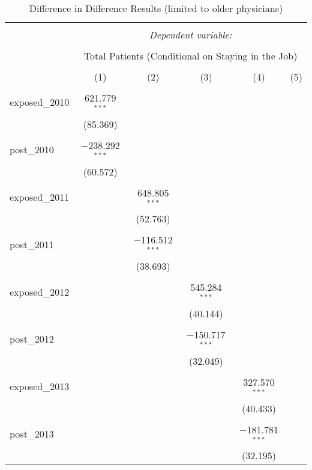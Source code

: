 
\begin{table}[!htbp] \centering 
  \caption{Difference in Difference Results (limited to older physicians)} 
  \label{} 
\begin{tabular}{@{\extracolsep{5pt}}lccccc} 
\\[-1.8ex]\hline 
\hline \\[-1.8ex] 
 & \multicolumn{5}{c}{\textit{Dependent variable:}} \\ 
\cline{2-6} 
\\[-1.8ex] & \multicolumn{5}{c}{Total Patients (Conditional on Staying in the Job)} \\ 
\\[-1.8ex] & (1) & (2) & (3) & (4) & (5)\\ 
\hline \\[-1.8ex] 
 exposed\_2010 & 621.779$^{***}$ &  &  &  &  \\ 
  & (85.369) &  &  &  &  \\ 
  & & & & & \\ 
 post\_2010 & $-$238.292$^{***}$ &  &  &  &  \\ 
  & (60.572) &  &  &  &  \\ 
  & & & & & \\ 
 exposed\_2011 &  & 648.805$^{***}$ &  &  &  \\ 
  &  & (52.763) &  &  &  \\ 
  & & & & & \\ 
 post\_2011 &  & $-$116.512$^{***}$ &  &  &  \\ 
  &  & (38.693) &  &  &  \\ 
  & & & & & \\ 
 exposed\_2012 &  &  & 545.284$^{***}$ &  &  \\ 
  &  &  & (40.144) &  &  \\ 
  & & & & & \\ 
 post\_2012 &  &  & $-$150.717$^{***}$ &  &  \\ 
  &  &  & (32.049) &  &  \\ 
  & & & & & \\ 
 exposed\_2013 &  &  &  & 327.570$^{***}$ &  \\ 
  &  &  &  & (40.433) &  \\ 
  & & & & & \\ 
 post\_2013 &  &  &  & $-$181.781$^{***}$ &  \\ 
  &  &  &  & (32.195) &  \\ 

\end{tabular}
\end{table}
